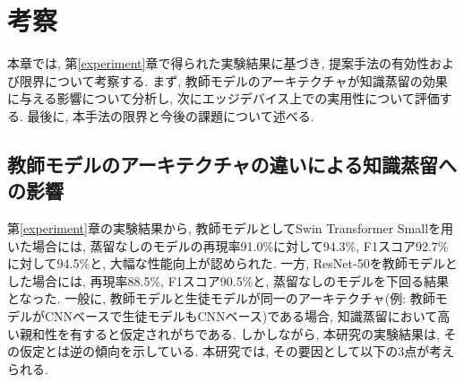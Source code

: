 \chapter{考察} \label{discussion}
本章では, 第\ref{experiment}章で得られた実験結果に基づき, 提案手法の有効性および限界について考察する.
まず, 教師モデルのアーキテクチャが知識蒸留の効果に与える影響について分析し, 次にエッジデバイス上での実用性について評価する.
最後に, 本手法の限界と今後の課題について述べる.

\section{教師モデルのアーキテクチャの違いによる知識蒸留への影響}
第\ref{experiment}章の実験結果から, 教師モデルとしてSwin Transformer Smallを用いた場合には, 蒸留なしのモデルの再現率91.0\%に対して94.3\%, F1スコア92.7\%に対して94.5\%と, 大幅な性能向上が認められた. 
一方, ResNet-50を教師モデルとした場合には, 再現率88.5\%, F1スコア90.5\%と, 蒸留なしのモデルを下回る結果となった.
一般に, 教師モデルと生徒モデルが同一のアーキテクチャ(例: 教師モデルがCNNベースで生徒モデルもCNNベース)である場合, 知識蒸留において高い親和性を有すると仮定されがちである. 
しかしながら, 本研究の実験結果は, その仮定とは逆の傾向を示している.
本研究では, その要因として以下の3点が考えられる. 

